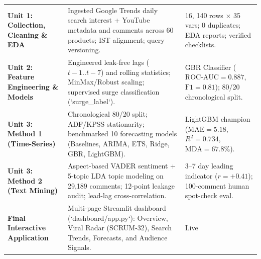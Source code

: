 \documentclass[aspectratio=169, 10pt]{beamer}
\begin{document}
\begin{frame}[t]
\begin{table}[h]
\begin{tabular}{p{2.3cm}p{7.2cm}p{3.5cm}}
                \textbf{Unit 1: Collection, Cleaning \& EDA} & Ingested Google Trends daily search interest + YouTube metadata and comments across 60 products; IST alignment; query versioning. & 16, 
  140 rows $\times$ 35 vars; 0 duplicates; EDA reports; verified checklists. \\                                                                                                                        
                \addlinespace[2pt]                                                                                                                                                                     
                \textbf{Unit 2: Feature Engineering \& Models} & Engineered leak-free lags ($t-1..t-7$) and rolling statistics; MinMax/Robust scaling; supervised surge classification (`surge_label`).
  & GBR Classifier ($\text{ROC-AUC}=0.887$, $\text{F1}=0.81$); 80/20 chronological split. \\                                                                                                           
                \addlinespace[2pt]                                                                                                                                                                     
                \textbf{Unit 3: Method 1 (Time-Series)} & Chronological 80/20 split; ADF/KPSS stationarity; benchmarked 10 forecasting models (Baselines, ARIMA, ETS, Ridge, GBR, LightGBM). & LightGBM
  champion ($\text{MAE}=5.18$, $R^2=0.734$, $\text{MDA}=67.8\%$). \\                                                                                                                                   
                \addlinespace[2pt]                                                                                                                                                                     
                \textbf{Unit 3: Method 2 (Text Mining)} & Aspect-based VADER sentiment + 5-topic LDA topic modeling on 29,189 comments; 12-point leakage audit; lead-lag cross-correlation. & 3--7 day 
  leading indicator ($r=+0.41$); 100-comment human spot-check eval. \\                                                                                                                                 
                \addlinespace[2pt]                                                                                                                                                                     
                \textbf{Final Interactive Application} & Multi-page Streamlit dashboard (`dashboard/app.py`): Overview, Viral Radar (SCRUM-32), Search Trends, Forecasts, and Audience Signals. & Live 

\end{tabular}
\end{table}
\end{frame}
\end{document}
